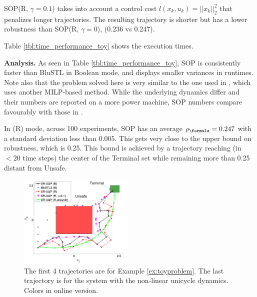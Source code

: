 \begin{exmp}
SOP(R, $\gamma\!=\!0.1$) takes into account a control cost $l(x_k,u_k) = ||x_k||_{2}^2$ that penalizes longer trajectories.
The resulting trajectory is shorter but has a lower robustness than SOP(R, $\gamma = 0$), ($0.236$ vs $0.247$).

Table \ref{tbl:time_performance_toy} shows the execution times. 


\textbf{Analysis.}
As seen in Table \ref{tbl:time_performance_toy}, SOP is consistently faster than BluSTL in Boolean mode, and displays smaller variances in runtimes. 
Note also that the problem solved here is very similar to the one used in \cite{Saha_acc16}, which uses another MILP-based method. 
While the underlying dynamics differ and their numbers are reported on a more power machine, 
SOP numbers compare favourably with those in \cite{Saha_acc16}.

In (R) mode, across 100 experiments, SOP has an average $\rob_{\formula}=0.247$ with a standard deviation less than $0.005$. 
This gets very close to the upper bound on robustness, which is 0.25.
This bound is achieved by a trajectory reaching (in $<20$ time steps) the center of the Terminal set while remaining more than 0.25 distant from Unsafe. 
\end{exmp}

\begin{figure}[t]
\centering
\includegraphics[width=0.49\textwidth]{figures/ToyExUni_alternate_scissored.pdf}
\vspace{-20pt}
\caption{{\small The first 4 trajectories are for Example \ref{ex:toyproblem}. The last trajectory is for the system with the non-linear unicycle dynamics. Colors in online version.}}
\label{fig:toy control}
\vspace{-10pt}
\end{figure}



